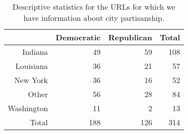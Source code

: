 \begin{table}[ht]
\centering
\begin{tabular}{rrrr}
  \hline
 & Democratic & Republican & Total \\ 
  \hline
Indiana &  49 &  59 & 108 \\ 
  Louisiana &  36 &  21 &  57 \\ 
  New York &  36 &  16 &  52 \\ 
  Other &  56 &  28 &  84 \\ 
  Washington &  11 &   2 &  13 \\ 
  Total & 188 & 126 & 314 \\ 
   \hline
\end{tabular}
\caption{Descriptive statistics for the URLs for which we have information about city partisanship.} 
\label{urlSummary}
\end{table}

